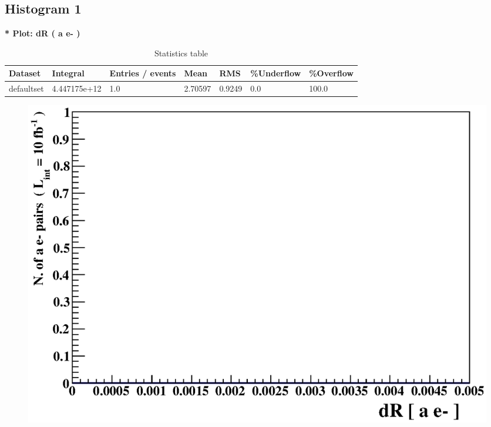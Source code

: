 \documentclass[a4paper, 11pt]{article}
\begin{document}
\subsection{ Histogram 1}

   \textbf{   * Plot: dR ( a e- ) }
\textbf{ }\begin{table}[!h]
  \begin{center}
    \caption{ Statistics table}
    \begin{tabular}{|m{17.0mm}|m{27.0mm}|m{23.0mm}|m{18.0mm}|m{18.0mm}|m{14.0mm}|m{14.0mm}|}
      \hline
      \cellcolor{yellow}         Dataset& \cellcolor{yellow}         Integral& \cellcolor{yellow}         Entries /\- events& \cellcolor{yellow}         Mean& \cellcolor{yellow}         RMS& \cellcolor{yellow}         \%Underflow& \cellcolor{yellow}         \%Overflow\\
      \hline
      \cellcolor{white}         defaultset& \cellcolor{white}         4.447175e+12& \cellcolor{white}         1.0& \cellcolor{white}         2.70597& \cellcolor{white}         0.9249& \cellcolor{red}         0.0& \cellcolor{red}         100.0\\
\hline
    \end{tabular}
  \end{center}
\end{table}

\begin{figure}[!h]
  \begin{center}
    \includegraphics[scale=0.6]{selection_0.eps}\\
\caption{}
  \end{center}
\end{figure}
\newpage
   
\end{document}

